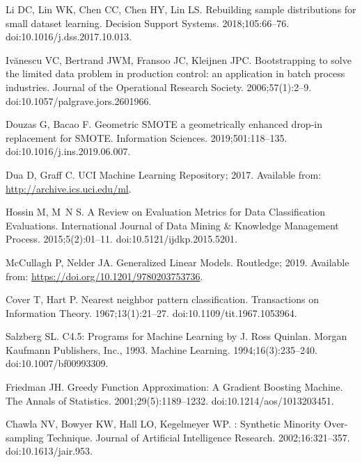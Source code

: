 \documentclass[10pt,letterpaper]{article}
\begin{document}
\begin{thebibliography}{10}
  Li DC, Lin WK, Chen CC, Chen HY, Lin LS.
  \newblock Rebuilding sample distributions for small dataset learning.
  \newblock Decision Support Systems. 2018;105:66--76.
  \newblock doi:{10.1016/j.dss.2017.10.013}.
  
  Iv{\u{a}}nescu VC, Bertrand JWM, Fransoo JC, Kleijnen JPC.
  \newblock Bootstrapping to solve the limited data problem in production
    control: an application in batch process industries.
  \newblock Journal of the Operational Research Society. 2006;57(1):2--9.
  \newblock doi:{10.1057/palgrave.jors.2601966}.
  
  Douzas G, Bacao F.
  \newblock Geometric {SMOTE} a geometrically enhanced drop-in replacement for
    {SMOTE}.
  \newblock Information Sciences. 2019;501:118--135.
  \newblock doi:{10.1016/j.ins.2019.06.007}.
  
  Dua D, Graff C. {UCI} Machine Learning Repository; 2017.
  \newblock Available from: \url{http://archive.ics.uci.edu/ml}.
  
  Hossin M, M~N S.
  \newblock A Review on Evaluation Metrics for Data Classification Evaluations.
  \newblock International Journal of Data Mining {\&} Knowledge Management
    Process. 2015;5(2):01--11.
  \newblock doi:{10.5121/ijdkp.2015.5201}.
  
  McCullagh P, Nelder JA.
  \newblock Generalized Linear Models.
  \newblock Routledge; 2019.
  \newblock Available from: \url{https://doi.org/10.1201/9780203753736}.
  
  Cover T, Hart P.
  \newblock Nearest neighbor pattern classification.
   Transactions on Information Theory. 1967;13(1):21--27.
  \newblock doi:{10.1109/tit.1967.1053964}.
  
  Salzberg SL.
  \newblock C4.5: Programs for Machine Learning by J. Ross Quinlan. Morgan
    Kaufmann Publishers, Inc., 1993.
  \newblock Machine Learning. 1994;16(3):235--240.
  \newblock doi:{10.1007/bf00993309}.
  
  Friedman JH.
  \newblock Greedy Function Approximation: A Gradient Boosting Machine.
  \newblock The Annals of Statistics. 2001;29(5):1189--1232.
  \newblock doi:{10.1214/aos/1013203451}.
  
  Chawla NV, Bowyer KW, Hall LO, Kegelmeyer WP.
  : Synthetic Minority Over-sampling Technique.
  \newblock Journal of Artificial Intelligence Research. 2002;16:321--357.
  \newblock doi:{10.1613/jair.953}.
  

\end{thebibliography}
\end{document}
